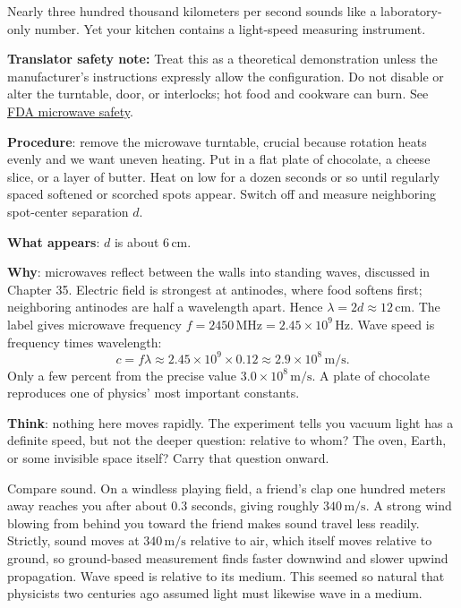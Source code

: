 \begin{experiment}
Nearly three hundred thousand kilometers per second sounds like a laboratory-only number. Yet your kitchen contains a light-speed measuring instrument.

\textbf{Translator safety note:} Treat this as a theoretical demonstration unless the manufacturer's instructions expressly allow the configuration. Do not disable or alter the turntable, door, or interlocks; hot food and cookware can burn. See \href{https://www.fda.gov/radiation-emitting-products/resources-you-radiation-emitting-products/microwave-ovens}{FDA microwave safety}.

\textbf{Procedure}: remove the microwave turntable, crucial because rotation heats evenly and we want uneven heating. Put in a flat plate of chocolate, a cheese slice, or a layer of butter. Heat on low for a dozen seconds or so until regularly spaced softened or scorched spots appear. Switch off and measure neighboring spot-center separation \(d\).

\textbf{What appears}: \(d\) is about \(6\,\mathrm{cm}\).

\textbf{Why}: microwaves reflect between the walls into standing waves, discussed in Chapter 35. Electric field is strongest at antinodes, where food softens first; neighboring antinodes are half a wavelength apart. Hence \(\lambda=2d\approx 12\,\mathrm{cm}\). The label gives microwave frequency \(f=2450\,\mathrm{MHz}=2.45\times10^{9}\,\mathrm{Hz}\). Wave speed is frequency times wavelength:
\[
c=f\lambda\approx 2.45\times10^{9}\times 0.12\approx 2.9\times10^{8}\,\mathrm{m/s}.
\]
Only a few percent from the precise value \(3.0\times10^{8}\,\mathrm{m/s}\). A plate of chocolate reproduces one of physics' most important constants.

\textbf{Think}: nothing here moves rapidly. The experiment tells you vacuum light has a definite speed, but not the deeper question: relative to whom? The oven, Earth, or some invisible space itself? Carry that question onward.
\end{experiment}

Compare sound. On a windless playing field, a friend's clap one hundred meters away reaches you after about \(0.3\) seconds, giving roughly \(340\,\mathrm{m/s}\). A strong wind blowing from behind you toward the friend makes sound travel less readily. Strictly, sound moves at \(340\,\mathrm{m/s}\) relative to air, which itself moves relative to ground, so ground-based measurement finds faster downwind and slower upwind propagation. Wave speed is relative to its medium. This seemed so natural that physicists two centuries ago assumed light must likewise wave in a medium.

